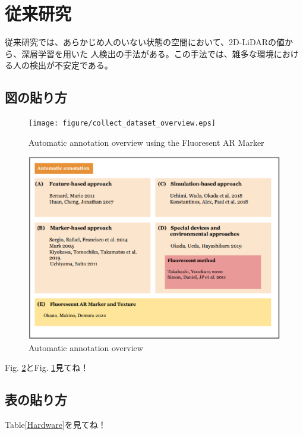 \section{従来研究}
従来研究では、あらかじめ人のいない状態の空間において、2D-LiDARの値から、深層学習を用いた
人検出の手法がある。この手法では、雑多な環境における人の検出が不安定である。

\subsection{図の貼り方}

\begin{figure}[b]
\begin{center}
\texttt{[image: figure/collect\_dataset\_overview.eps]}
\caption{Automatic annotation overview using the Fluoresent AR Marker}
\label{Automatic annotation overview using a Fluoresent AR marker}
\end{center}
\end{figure}

\begin{figure}[t]
\begin{center}
\includegraphics[width=160mm,clip]{figure/related_overview.eps}
\caption{Automatic annotation overview}
\label{Automatic annotation overview}
\end{center}
\end{figure}

Fig. \ref{Automatic annotation overview}とFig. \ref{Automatic annotation overview using a Fluoresent AR marker}見てね！

\subsection{表の貼り方}
Table\ref{Hardware}を見てね！

